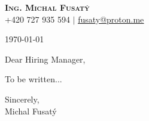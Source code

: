 \documentclass[letterpaper,11pt]{article}
\begin{document}
\begin{center}
    \textbf{\Huge \scshape Ing. Michal Fusatý} \\ \vspace{3pt}
    \small +420 727 935 594 $|$ \href{mailto:fusaty@proton.me}{\underline{fusaty@proton.me}}
\end{center}

\vspace{10pt}
\begin{flushleft}
    \today
\end{flushleft}

\vspace{15pt}
Dear Hiring Manager,

\vspace{10pt}

To be written...

\vspace{15pt}
Sincerely, \\
\vspace{1pt}
Michal Fusatý
\end{document}
